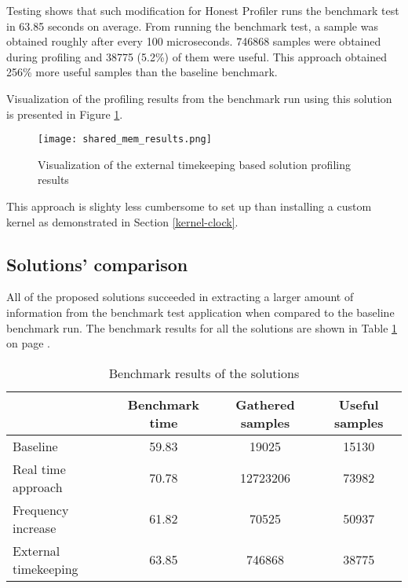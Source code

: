 \documentclass[..thesis.tex]{subfiles}
\begin{document}

Testing shows that such modification for Honest Profiler runs the benchmark test in 63.85 seconds on average.  From running the benchmark test, a sample was obtained roughly after every 100 microseconds. 746868 samples were obtained during profiling and 38775 (5.2\%) of them were useful. This approach obtained 256\% more useful samples than the baseline benchmark.

Visualization of the profiling results from the benchmark run using this solution is presented in Figure \ref{fig:shared-mem-results}.
\begin{figure}[H]
\texttt{[image: shared\_mem\_results.png]}
\caption{Visualization of the external timekeeping based solution profiling results}
\label{fig:shared-mem-results}
\end{figure} 

This approach is slighty less cumbersome to set up than installing a custom kernel as demonstrated in Section \ref{kernel-clock}. 

\subsection{Solutions' comparison}
All of the proposed solutions succeeded in extracting a larger amount of information from the benchmark test application when compared to the baseline benchmark run.
The benchmark results for all the solutions are shown in Table \ref{table:results} on page \pageref{table:results}. 

\begin{table}[H]
\centering
\caption{Benchmark results of the solutions}
\label{table:results}

\begin{tabular}{l | c | c | c}
 & Benchmark time  & Gathered samples&  Useful samples  \\
 \hline
Baseline & 59.83 & 19025 & 15130  \\
Real time approach & 70.78 & 12723206 & 73982 \\
Frequency increase & 61.82 & 70525 & 50937  \\
External timekeeping & 63.85 & 746868 & 38775 
\end{tabular}
\end{table}
\end{document}
